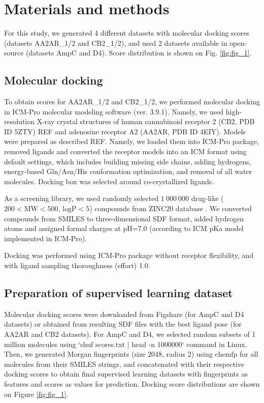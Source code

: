 \section{Materials and methods}
For this study, we generated 4 different datasets with molecular docking scores (datasets AA2AR\_1/2 and CB2\_1/2), and used 2 datasets available in open-source \cite{ultralarge_docking_first} (datasets AmpC and D4). Score distribution is shown on Fig. \ref{fig:fig_1}.

\subsection{Molecular docking}
To obtain scores for AA2AR\_1/2 and CB2\_1/2, we performed molecular docking in ICM-Pro molecular modeling software (ver. 3.9.1). Namely, we used high-resolution X-ray crystal structures of human cannabinoid receptor 2 (CB2, PDB ID 5ZTY) REF and adenosine receptor A2 (AA2AR, PDB ID 4EIY). Models were prepared as described REF. Namely, we loaded them into ICM-Pro package, removed ligands and converted the receptor models into an ICM format using default settings, which includes building missing side chains, adding hydrogens, energy-based Gln/Asn/His conformation optimization, and removal of all water molecules. Docking box was selected around co-crystallized ligands.

As a screening library, we used randomly selected $1\ 000\ 000$ drug-like ($200 < \text{MW} < 500$, $\text{logP} < 5$) compounds from ZINC20 database \cite{Irwin2020ZINC20Discovery} . We converted compounds from SMILES to three-dimensional SDF  format, added hydrogen atoms and assigned formal charges at pH=7.0 (according to ICM pKa model implemented in ICM-Pro).

Docking was performed using ICM-Pro package without receptor flexibility, and with ligand sampling thoroughness (effort) 1.0.

\subsection{Preparation of supervised learning dataset}
Molecular docking scores were downloaded from Figshare (for AmpC and D4 datasets) or obtained from resulting SDF files with the best ligand pose (for AA2AR and CB2 datasets). For AmpC and D4, we selected random subsets of 1 million molecules using `shuf scores.txt | head -n 1000000` command in Linux. Then, we generated Morgan fingerprints (size 2048, radius 2) using $\text{chemfp}$ \cite{Dalke2019} for all molecules from their SMILES strings, and concatenated with their respective docking scores to obtain final supervised learning datasets with fingerprints as features and scores as values for prediction. Docking score distributions are shown on Figure \ref{fig:fig_1}.



